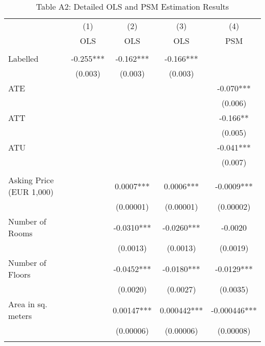 \documentclass[12pt]{article}
\begin{document}
\begin{table}[H]
\scriptsize
  \centering
  \caption*{Table A2: Detailed OLS and PSM Estimation Results}
      \begin{tabular}{lcccc}
\hline
                &\multicolumn{1}{c}{(1)}&\multicolumn{1}{c}{(2)}&\multicolumn{1}{c}{(3)}&\multicolumn{1}{c}{(4)}\\
& OLS                      & OLS & OLS & PSM \\
\hline
&&&&\\
Labelled                        & -0.255***  & -0.162***   & -0.166***   &              \\
                                & (0.003)  & (0.003)   & (0.003)   &              \\
ATE                             &            &             &             & -0.070***    \\
                                &            &             &             & (0.006)    \\
ATT                             &            &             &             & -0.166**     \\
                                &            &             &             & (0.005)    \\
ATU                             &            &             &             & -0.041***    \\
                                &            &             &             & (0.007)    \\
&&&&\\
Asking Price (EUR 1,000)            &            & 0.0007*** & 0.0006*** & -0.0009*** \\
                                &            & (0.00001) & (0.00001) & (0.00002)  \\
Number of Rooms                 &            & -0.0310***  & -0.0260***  & -0.0020 \\
                                &            & (0.0013)   & (0.0013)   &   (0.0019)           \\
Number of Floors                &            & -0.0452***  & -0.0180***  & -0.0129***   \\
                                &            & (0.0020)   & (0.0027)   & (0.0035)    \\
Area in sq. meters              &            & 0.00147***  & 0.000442*** & -0.000446*** \\
                                &            & (0.00006) & (0.00006) & (0.00008)  \\
&&&&\\


\end{tabular}
\end{table}
\end{document}
